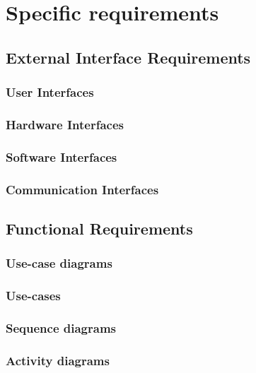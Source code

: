 
\setchapterpreamble[u]{\margintoc}
\chapter{Specific requirements}
	\section{External Interface Requirements}
		\subsection{User Interfaces}
		\subsection{Hardware Interfaces}
		\subsection{Software Interfaces}
		\subsection{Communication Interfaces}
	\section{Functional Requirements}
		\subsection{Use-case diagrams}
		\subsection{Use-cases}
		\subsection{Sequence diagrams}
		\subsection{Activity diagrams}
